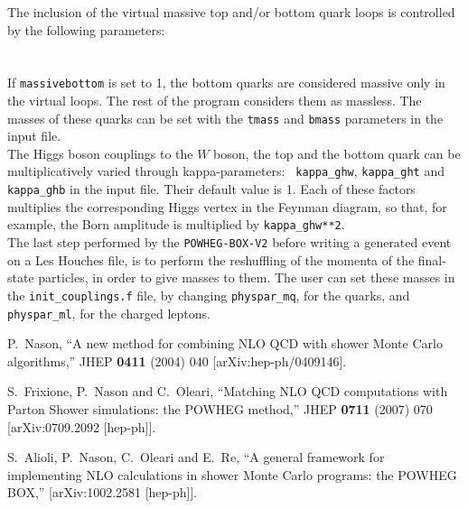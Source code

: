 \documentclass[paper]{JHEP3}
\newcommand\POWHEGBOXV{{\tt POWHEG-BOX-V2}}
\begin{document}
{\noindent The inclusion of the virtual  massive top and/or bottom quark loops is
controlled by the following parameters:\\
\\
\\
%
If {\tt massivebottom} is set to 1, the bottom quarks are considered massive
only in the virtual loops. The rest of the program considers them as
massless. The masses of these quarks can be set with the {\tt tmass} and
{\tt bmass} parameters in the input file.\\


\noindent The Higgs boson couplings to the $W$ boson, the top and the bottom
quark can be multiplicatively varied through kappa-parameters: {\tt
  kappa\_ghw}, {\tt kappa\_ght} and {\tt kappa\_ghb} in the input file. Their
default value is 1. Each of these factors multiplies the corresponding Higgs
vertex in the Feynman diagram, so that, for example, the Born amplitude is
multiplied by {\tt kappa\_ghw**2}. \\

\noindent The last step performed by the \POWHEGBOXV{} before writing a
generated event on a Les Houches file, is to perform the reshuffling of the
momenta of the final-state particles, in order to give masses to them.  The
user can set these masses in the {\tt init\_couplings.f} file, by changing
{\tt physpar\_mq}, for the quarks, and {\tt physpar\_ml}, for the
charged leptons.


\begin{thebibliography}{10}

  P.~Nason,
  ``A new method for combining NLO QCD with shower Monte Carlo algorithms,''
  JHEP {\bf 0411} (2004) 040
  [arXiv:hep-ph/0409146].

  S.~Frixione, P.~Nason and C.~Oleari,
``Matching NLO QCD computations with Parton Shower simulations: the POWHEG
method,''
  JHEP {\bf 0711} (2007) 070
  [arXiv:0709.2092 [hep-ph]].

  S.~Alioli, P.~Nason, C.~Oleari and E.~Re,
``A general framework for implementing NLO calculations in shower Monte Carlo
  programs: the POWHEG BOX,''
  [arXiv:1002.2581 [hep-ph]].


\end{thebibliography}}
\end{document}
